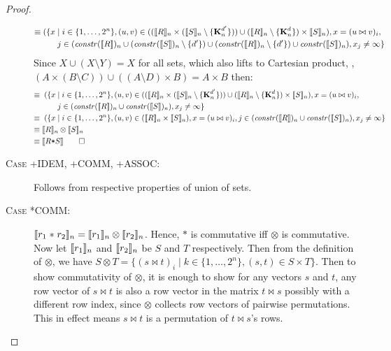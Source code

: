 \begin{proof}
\begin{description}
\begin{align*}
\equiv & \; (\{x \mid i \in \{1, \ldots, 2^n\},
                   (u, v) \in ((\interp{R}_n \times (\interp{S}_n \setminus
         \{\zeroEntry{d'}{n}\})) \cup (\interp{R}_n \setminus
         \{\zeroEntry{d}{n}\}) \times \interp{S}_n),
                   x = (u \bowtie v)_i, \\
 & \qquad         j \in (\effdims{\interp{R}}{n} \cup
         (\effdims{\interp{S}}{n} \setminus \{d'\}) \cup (\effdims{\interp{R}}{n} \setminus
         \{d'\}) \cup \effdims{\interp{S}}{n}),
                   x_j \neq \infty
                  \}
\end{align*}
%
Since $X \cup (X \setminus Y) = X$ for all sets, which also lifts to
Cartesian product, \ie{}, $(A \times (B \setminus C)) \cup ((A \setminus
D) \times B) = A \times B$ then:
%
\begin{align*}
\equiv \; & \; (\{x \mid i \in \{1, \ldots, 2^n\},
                   (u, v) \in ((\interp{R}_n \times (\interp{S}_n \setminus
         \{\zeroEntry{d'}{n}\})) \cup (\interp{R}_n \setminus
         \{\zeroEntry{d}{n}\}) \times \interp{S}_n),
                   x = (u \bowtie v)_i, \\
 & \qquad         j \in (\effdims{\interp{R}}{n} \cup \effdims{\interp{S}}{n}),
                   x_j \neq \infty
                  \} \\
\equiv \; & \; (\{x \mid i \in \{1, \ldots, 2^n\},
                   (u, v) \in (\interp{R}_n \times \interp{S}_n),
                   x = (u \bowtie v)_i, j \in (\effdims{\interp{R}}{n} \cup \effdims{\interp{S}}{n}),
                   x_j \neq \infty
                  \} \\
\equiv \; & \interp{R}_n \otimes \interp{S}_n \\
\equiv \; & \interp{R \term{*} S} \qed
\end{align*}

  \item[\textsc{Case +IDEM, +COMM, +ASSOC}:]
    Follows from respective properties of union of sets.
  \item[\textsc{Case *COMM}:] $\interp{r_1 \; \texttt{$\ast$} \; r_2}_n =
    \interp{r_1}_n \otimes \interp{r_2}_n$. Hence, $\texttt{$\ast$}$ is
    commutative iff $\otimes$ is commutative. Now let $\interp{r_1}_n$ and
    $\interp{r_2}_n$ be $S$ and $T$ respectively. Then from the definition of
    $\otimes$, we have $S \otimes T = \{ (s \bowtie t)_i \mid k \in
    \{ 1, \ldots, 2^n \}, (s,t) \in S \times T \}$. Then to show
    commutativity of $\otimes$, it is enough to show for any vectors $s$ and
    $t$, any row vector of $s \bowtie t$ is also a row vector in the matrix
    $t \bowtie s$ possibly with a different row index, since $\otimes$ collects
    row vectors of pairwise permutations. This in effect means $s \bowtie t$
    is a permutation of $t \bowtie s$'s rows.


\end{description}
\end{proof}
